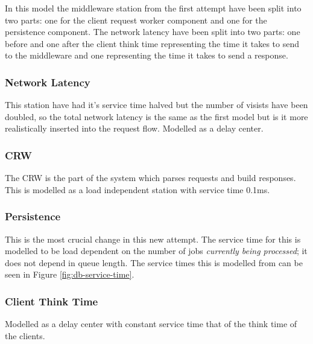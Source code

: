 \documentclass[a4paper, 11pt]{article}
\begin{document}
	In this model the middleware station from the first attempt have been split into two parts: one for the client request worker component and one for the persistence component. The network latency have been split into two parts: one before and one after the client think time representing the time it takes to send to the middleware and one representing the time it takes to send a response.

	\subsubsection{Network Latency}
		This station have had it's service time halved but the number of visists have been doubled, so the total network latency is the same as the first model but is it more realistically inserted into the request flow. Modelled as a delay center.

	\subsubsection{CRW}
		The CRW is the part of the system which parses requests and build responses. This is modelled as a load independent station with service time 0.1ms.

	\subsubsection{Persistence}
		This is the most crucial change in this new attempt. The service time for this is modelled to be load dependent on the number of jobs \textit{currently being processed}; it does not depend in queue length. The service times this is modelled from can be seen in Figure \ref{fig:db-service-time}.
	
	\subsubsection{Client Think Time}
		Modelled as a delay center with constant service time that of the think time of the clients.
\end{document}
